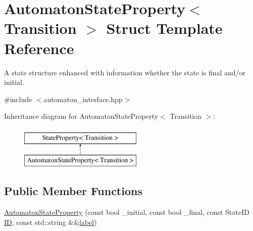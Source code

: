 \hypertarget{structAutomatonStateProperty}{\section{\-Automaton\-State\-Property$<$ \-Transition $>$ \-Struct \-Template \-Reference}
\label{structAutomatonStateProperty}
}


\-A state structure enhanced with information whether the state is final and/or initial.  




{\ttfamily \#include $<$automaton\-\_\-interface.\-hpp$>$}

\-Inheritance diagram for \-Automaton\-State\-Property$<$ \-Transition $>$\-:\begin{figure}[H]
\begin{center}
\leavevmode
\includegraphics[height=2.000000cm]{structAutomatonStateProperty}
\end{center}
\end{figure}
\subsection*{\-Public \-Member \-Functions}
\begin{DoxyCompactItemize}
\item 
\hyperlink{structAutomatonStateProperty_aefba38decd169cc6177e59cd9bce67d0}{\-Automaton\-State\-Property} (const bool \-\_\-initial, const bool \-\_\-final, const \-State\-I\-D \hyperlink{structStateProperty_af33be20c9033f9b6524c0447e7ac647e}{\-I\-D}, const std\-::string \&\&\hyperlink{structStateProperty_a7cfb634f80b68196eefa54e8ee98a5fe}{label})
\end{DoxyCompactItemize}
